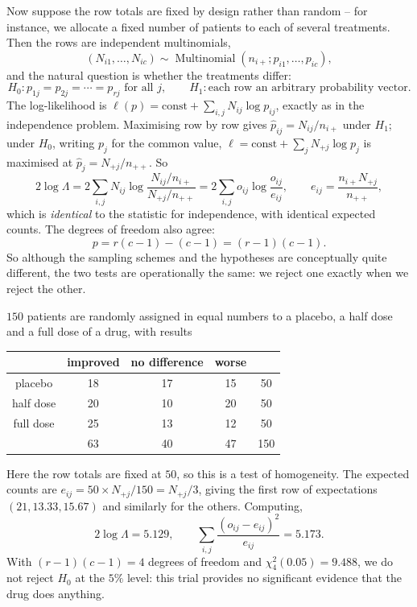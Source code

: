 \documentclass[a4paper]{scrartcl}
\newcommand{\Multi}{\operatorname{Multinomial}}
\begin{document}
Now suppose the row totals are fixed by design rather than random -- for instance, we allocate a fixed number of patients to each of several treatments. Then the rows are independent multinomials,
$$
(N_{i1},\dots,N_{ic}) \sim \Multi\left(n_{i+}; p_{i1},\dots,p_{ic}\right),
$$
and the natural question is whether the treatments differ:
$$
H_0 : p_{1j} = p_{2j} = \cdots = p_{rj} \text{ for all } j, \qquad H_1 : \text{each row an arbitrary probability vector}.
$$
The log-likelihood is $\ell(p) = \text{const} + \sum_{i,j}N_{ij}\log p_{ij}$, exactly as in the independence problem. Maximising row by row gives $\hat p_{ij} = N_{ij}/n_{i+}$ under $H_1$; under $H_0$, writing $p_j$ for the common value, $\ell = \text{const}+\sum_j N_{+j}\log p_j$ is maximised at $\hat p_j = N_{+j}/n_{++}$. So
$$
2\log\Lambda = 2\sum_{i,j}N_{ij}\log\frac{N_{ij}/n_{i+}}{N_{+j}/n_{++}} = 2\sum_{i,j}o_{ij}\log\frac{o_{ij}}{e_{ij}}, \qquad e_{ij} = \frac{n_{i+}N_{+j}}{n_{++}},
$$
which is \emph{identical} to the statistic for independence, with identical expected counts. The degrees of freedom also agree:
$$
p = r(c-1) - (c-1) = (r-1)(c-1).
$$
So although the sampling schemes and the hypotheses are conceptually quite different, the two tests are operationally the same: we reject one exactly when we reject the other.

\begin{example}
  $150$ patients are randomly assigned in equal numbers to a placebo, a half dose and a full dose of a drug, with results

  \begin{center}
  \begin{tabular}{c | c c c | c}
              & improved & no difference & worse & \\\hline
    placebo   & 18       & 17            & 15    & 50 \\
    half dose & 20       & 10            & 20    & 50 \\
    full dose & 25       & 13            & 12    & 50 \\\hline
              & 63       & 40            & 47    & 150
  \end{tabular}
  \end{center}

  Here the row totals are fixed at $50$, so this is a test of homogeneity. The expected counts are $e_{ij} = 50 \times N_{+j}/150 = N_{+j}/3$, giving the first row of expectations $(21, 13.33, 15.67)$ and similarly for the others. Computing,
  $$
  2\log\Lambda = 5.129, \qquad \sum_{i,j}\frac{(o_{ij}-e_{ij})^2}{e_{ij}} = 5.173.
  $$
  With $(r-1)(c-1) = 4$ degrees of freedom and $\chi^2_4(0.05) = 9.488$, we do not reject $H_0$ at the $5\%$ level: this trial provides no significant evidence that the drug does anything.
\end{example}
\end{document}
